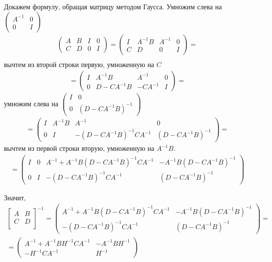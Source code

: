 \documentclass[pdftex,11pt,openany]{book}\usepackage[]{graphicx}\usepackage[]{color}
\begin{document}
\begin{solution}
Докажем формулу, обращая матрицу методом Гаусса. Умножим слева на $\left(\begin{array}{cc}
A^{-1} & 0\\ 
0 & I
\end{array}\right)$
\begin{multline*}
\left(\begin{array}{cc|cc}
A & B & I & 0\\ 
C & D & 0 & I
\end{array}\right)=
\left(\begin{array}{cc|cc}
I & A^{-1}B & A^{-1} & 0\\ 
C & D & 0 & I
\end{array}\right)=\\
\end{multline*}
вычтем из второй строки первую, умноженную на $C$
\begin{multline*}
=\left(\begin{array}{cc|cc}
I & A^{-1}B & A^{-1} & 0\\ 
0 & D-CA^{-1}B & -CA^{-1} & I
\end{array}\right)=
\end{multline*}
умножим слева на $\left(\begin{array}{cc}
I & 0\\ 
0 & (D-CA^{-1}B)^{-1}
\end{array}\right)$
\begin{multline*}
=\left(\begin{array}{cc|cc}
I & A^{-1}B & A^{-1} & 0\\ 
0 & I & -(D-CA^{-1}B)^{-1}CA^{-1} & (D-CA^{-1}B)^{-1}
\end{array}\right)=
\end{multline*}
вычтем из первой строки вторую, умноженную на $A^{-1}B$. 
\begin{multline*}
=\left(\begin{array}{cc|cc}
I & 0 & A^{-1}+A^{-1}B(D-CA^{-1}B)^{-1}CA^{-1} & -A^{-1}B(D-CA^{-1}B)^{-1}\\ 
0 & I & -(D-CA^{-1}B)^{-1}CA^{-1} & (D-CA^{-1}B)^{-1}
\end{array}\right)
\end{multline*}

Значит,
\begin{multline*}
\begin{bmatrix} A & B \\ C & D \\ \end{bmatrix}^{-1}
=\left(\begin{array}{cc}
A^{-1}+A^{-1}B(D-CA^{-1}B)^{-1}CA^{-1} & -A^{-1}B(D-CA^{-1}B)^{-1}\\ 
-(D-CA^{-1}B)^{-1}CA^{-1} & (D-CA^{-1}B)^{-1}
\end{array}\right)=\\=
\begin{pmatrix} A^{-1} +A^{-1} BH^{-1} CA^{-1}  & -A^{-1} BH^{-1}\\ -H^{-1} CA^{-1}  & H^{-1}\end{pmatrix}
\end{multline*}


\end{solution}
\end{document}
